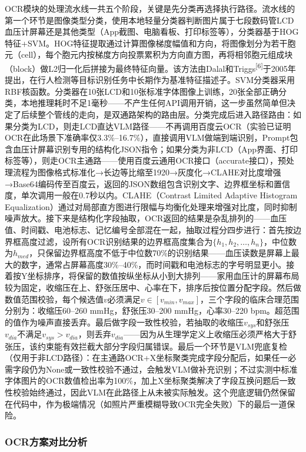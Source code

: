 \documentclass[zihao=-4,a4paper]{ctexart}
\begin{document}
OCR模块的处理流水线一共五个阶段，关键是先分类再选择执行路径。流水线的第一个环节是图像类型分类，使用本地轻量分类器判断图片属于七段数码管LCD血压计屏幕还是其他类型（App截图、电脑看板、打印标签等），分类器基于HOG特征+SVM。HOG特征提取通过计算图像梯度幅值和方向，将图像划分为若干胞元（cell），每个胞元内按梯度方向投票累积为方向直方图，再将相邻胞元组成块（block）做L2归一化后拼接为最终特征向量。该方法由Dalal和Triggs\textsuperscript{[6]}于2005年提出，在行人检测等目标识别任务中长期作为基准特征描述子。SVM分类器采用RBF核函数。分类器在10张LCD和10张标准字体图像上训练，20张全部正确分类，本地推理耗时不足1毫秒——不产生任何API调用开销，这一步虽然简单但决定了后续整个管线的走向，是双通路架构的路由层。分类完成后进入路径路由：如果分类为LCD，则走LCD直达VLM路径——不再调用百度云OCR（实验已证明OCR在此场景下准确率仅3.3\%--16.7\%），直接调用VLM做端到端识别，Prompt包含血压计屏幕识别专用的结构化JSON指令；如果分类为非LCD（App界面、打印标签等），则走OCR主通路——使用百度云通用OCR接口（accurate接口），预处理流程为图像格式标准化→长边等比缩至1920→灰度化→CLAHE对比度增强→Base64编码传至百度云，返回的JSON数组包含识别文字、边界框坐标和置信度，单次调用一般在0.7秒以内。CLAHE（Contrast Limited Adaptive Histogram Equalization）通过对局部直方图进行限幅与均衡化处理来增强对比度，同时抑制噪声放大。接下来是结构化字段抽取，OCR返回的结果是杂乱排列的——血压值、时间戳、电池标志、记忆编号全部混在一起，抽取过程分四步进行：首先按边界框高度过滤，设所有OCR识别结果的边界框高度集合为$\{h_1, h_2, \ldots, h_n\}$，中位数为$h_{med}$，只保留边界框高度不低于中位数70\%的识别结果——血压读数是屏幕上最大的数字，通常占屏幕高度30\%--40\%，而时间戳和电池标志的字号明显更小。接着按Y坐标排序，将保留的数值按纵坐标从小到大排列——家用血压计的屏幕布局较为固定，收缩压在上、舒张压居中、心率在下，排序后按位置分配字段。然后做数值范围校验，每个候选值$v$必须满足$v \in [v_{min}, v_{max}]$，三个字段的临床合理范围分别为：收缩压60--260 mmHg，舒张压30--200 mmHg，心率30--220 bpm。超范围的值作为噪声直接丢弃。最后做字段一致性校验，若抽取的收缩压$v_{sys}$和舒张压$v_{dia}$不满足$v_{sys} > v_{dia}$，则丢弃$v_{dia}$——因为从生理学定义上收缩压必须严格大于舒张压，该约束能有效拦截大部分字段归属错误。最后一个环节是VLM兜底复检（仅用于非LCD路径）：在主通路OCR+X坐标聚类完成字段分配后，如果任一必需字段仍为None或一致性校验不通过，会触发VLM做补充识别；不过实测中标准字体图片的OCR数值检出率为100\%，加上X坐标聚类解决了字段互换问题后一致性校验始终通过，因此VLM在此路径上从未被实际触发。这个兜底逻辑仍然保留在代码中，作为极端情况（如照片严重模糊导致OCR完全失败）下的最后一道保险。

\subsubsection{OCR方案对比分析}
\end{document}
